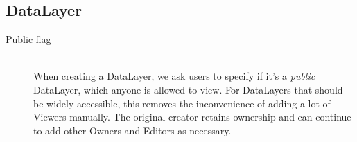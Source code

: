 
\subsection{DataLayer}
\begin{description}
\item[Public flag] \hfill \\
When creating a DataLayer, we ask users to specify if it's a \textit{public} DataLayer, which anyone is allowed to view. For DataLayers that should be widely-accessible, this removes the inconvenience of adding a lot of Viewers manually. The original creator retains ownership and can continue to add other Owners and Editors as necessary.
\end{description}














\label{design_srid}
